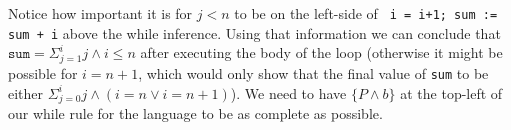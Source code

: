 \documentclass[10pt, oneside]{article}
\begin{document}
\begin{enumerate}[1.]
\begin{enumerate} [(a)]
      Notice how important it is for $j<n$ to be on the left-side of 
      \texttt{ i = i+1; sum := sum + i} above the while inference. Using that 
      information we can conclude that $\texttt{sum} = \Sigma_{j=1}^{i}j \wedge i 
      \leq n$ after executing the body of the loop (otherwise it might be possible 
      for $i = n +1$, which would only show that the final value of \texttt{sum} to 
      be either $\Sigma_{j=0}^{i}j \wedge (i = n \vee i = n + 1)$).  We need to 
      have $\{ P \wedge b \}$ at the top-left of our
      while rule for the language to be as complete as possible.
      
      
  \end{enumerate}

\end{enumerate}
\end{document}
